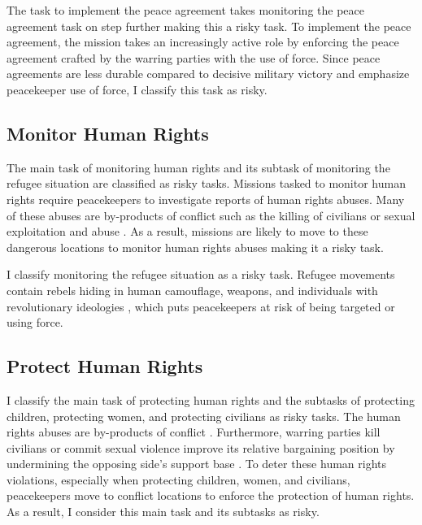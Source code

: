 The task to implement the peace agreement takes monitoring the peace agreement task on step further making this a risky task. To implement the peace agreement, the mission takes an increasingly active role by enforcing the peace agreement crafted by the warring parties with the use of force. Since peace agreements are less durable compared to decisive military victory \citep{fortna2004,walter2009} and emphasize peacekeeper use of force, I classify this task as risky. 

\subsection*{Monitor Human Rights}

The main task of monitoring human rights and its subtask of monitoring the refugee situation are classified as risky tasks. Missions tasked to monitor human rights require peacekeepers to investigate reports of human rights abuses. Many of these abuses are by-products of conflict such as the killing of civilians \citep{hultman2013united} or sexual exploitation and abuse \citep{johansson2019,kirschner2019}. As a result, missions are likely to move to these dangerous locations to monitor human rights abuses making it a risky task.

I classify monitoring the refugee situation as a risky task. Refugee movements contain rebels hiding in human camouflage, weapons, and individuals with revolutionary ideologies \citep{beardsley2011}, which puts peacekeepers at risk of being targeted or using force. 

\subsection*{Protect Human Rights}

I classify the main task of protecting human rights and the subtasks of protecting children, protecting women, and protecting civilians as risky tasks. The human rights abuses are by-products of conflict \citep{hultman2013united,johansson2019,kirschner2019}. Furthermore, warring parties kill civilians or commit sexual violence improve its relative bargaining position by undermining the opposing side's support base \citep{fjelde2014,fjelde2019,cohen2013}. To deter these human rights violations, especially when protecting children, women, and civilians, peacekeepers move to conflict locations to enforce the protection of human rights. As a result, I consider this main task and its subtasks as risky. 

